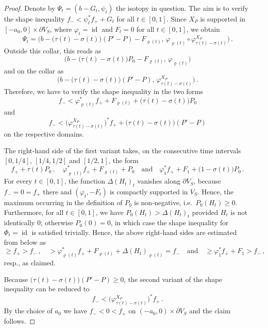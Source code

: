 \documentclass{amsart}
\theoremstyle{definition}
\DeclareMathOperator{\id}{\mathrm{id}}
\begin{document}
\begin{proof}
  Denote by $\Psi_t=(b-G_t,\psi_t)$ the isotopy in question.
  The aim is to verify the shape inequality
  $f_-<\psi_t^*f_++G_t$ for all $t\in[0,1]$.
  Since $X_P$ is supported in $[-a_0,0]\times\partial V_S$,
  where $\varphi_t=\id$ and $F_t=0$ for all $t\in[0,1]$,
  we obtain
  \[
    \Psi_t=
    \Big(
      b-\big(\tau(t)-\sigma(t)\big)(P'-P)-F_{\varrho(t)},\,
      \varphi_{\varrho(t)}\circ\varphi_{\tau(t)-\sigma(t)}^{X_P}
    \Big)
    \,.
  \]
  Outside this collar, this reads as
  \[
  \Big(b-\big(\tau(t)-\sigma(t)\big)P_0-F_{\varrho(t)},\,
  \varphi_{\varrho(t)}\Big)
  \]
  and on the collar as
  \[
  \Big(b-\big(\tau(t)-\sigma(t)\big)(P'-P),\,
  \varphi_{\tau(t)-\sigma(t)}^{X_P}\Big)
  \,.
  \]
  Therefore,
  we have to verify the shape inequality in the two forms
  \[
  f_-<
  \varphi_{\varrho(t)}^*f_++F_{\varrho(t)}
  +\big(\tau(t)-\sigma(t)\big)P_0
  \]
  and
  \[
  f_-<
  \big(\varphi_{\tau(t)-\sigma(t)}^{X_P}\big)^*f_+
  +\big(\tau(t)-\sigma(t)\big)(P'-P)
  \]
  on the respective domains.
  
  The right-hand side of the first variant takes,
  on the consecutive time intervals
  $[0,1/4]$, $[1/4,1/2]$ and $[1/2,1]$,
  the form
  \[
  f_++\tau(t)P_0
  \,,
  \quad
  \varphi_{\varrho(t)}^*f_++F_{\varrho(t)}+P_0
  \quad\text{and}\quad
  \varphi_1^*f_++F_1
  +\big(1-\sigma(t)\big)P_0
  \,.
  \]
  For every $t\in[0,1]$,
  the function $\Delta(H_t)_t$ vanishes along $\partial V_S$,
  because $f_-=0=f_+$ there and
  $(\varphi_t,-F_t)$ is compactly supported in $V_S$.
  Hence,
  the maximum occurring in the definition of $P_0$
  is non-negative, i.e.\ $P_0(H_t)\geq0$.
  Furthermore,
  for all $t\in[0,1]$,
  we have $P_0(H_t)>\Delta(H_t)_t$ 
  provided $H_t$ is not identically $0$;
  otherwise $P_0(0)=0$,
  in which case the shape inequality for $\Phi_t=\id$
  is satisfied trivially.
  Hence,
  the above right-hand sides are estimated
  from below as
  \[
  \geq f_+>f_-
  \,,
  \quad
  >\varphi_{\varrho(t)}^*f_++F_{\varrho(t)}+\Delta(H_t)_{\varrho(t)}
  =f_-
  \quad\text{and}\quad
  \geq\varphi_1^*f_++F_1>f_-
  \,,
  \]
  resp., as claimed.
  
  Because $\big(\tau(t)-\sigma(t)\big)(P'-P)\geq0$,
  the second variant of the shape inequality
  can be reduced to
  \[
  f_-<
  \big(\varphi_{\tau(t)-\sigma(t)}^{X_P}\big)^*f_+
  \,.
  \]
  By the choice of $a_0$ we have
  $f_-<0<f_+$ on $(-a_0,0)\times\partial V_S$
  and the claim follows.
\end{proof}
\end{document}
